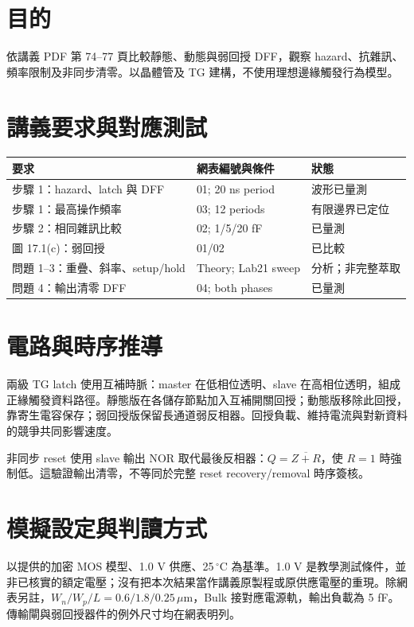\section{目的}

依講義 PDF 第 74--77 頁比較靜態、動態與弱回授 DFF，觀察 hazard、抗雜訊、頻率限制及非同步清零。以晶體管及 TG 建構，不使用理想邊緣觸發行為模型。

\section{講義要求與對應測試}

\begin{center}
\small
\setlength{\tabcolsep}{4pt}
\begin{tabular}{p{.42\linewidth}p{.29\linewidth}p{.18\linewidth}}
\toprule
要求 & 網表編號與條件 & 狀態 \\
\midrule
步驟 1：hazard、latch 與 DFF & 01; 20 ns period & 波形已量測 \\
步驟 1：最高操作頻率 & 03; 12 periods & 有限邊界已定位 \\
步驟 2：相同雜訊比較 & 02; 1/5/20 fF & 已量測 \\
圖 17.1(c)：弱回授 & 01/02 & 已比較 \\
問題 1--3：重疊、斜率、setup/hold & Theory; Lab21 sweep & 分析；非完整萃取 \\
問題 4：輸出清零 DFF & 04; both phases & 已量測 \\
\bottomrule
\end{tabular}
\end{center}

\section{電路與時序推導}

兩級 TG latch 使用互補時脈：master 在低相位透明、slave 在高相位透明，組成正緣觸發資料路徑。靜態版在各儲存節點加入互補開關回授；動態版移除此回授，靠寄生電容保存；弱回授版保留長通道弱反相器。回授負載、維持電流與對新資料的競爭共同影響速度。

非同步 reset 使用 slave 輸出 NOR 取代最後反相器：$Q=\overline{Z+R}$，使 $R=1$ 時強制低。這驗證輸出清零，不等同於完整 reset recovery/removal 時序簽核。

\section{模擬設定與判讀方式}

以提供的加密 MOS 模型、1.0 V 供應、25\,$^\circ$C 為基準。1.0 V 是教學測試條件，並非已核實的額定電壓；沒有把本次結果當作講義原製程或原供應電壓的重現。除網表另註，$W_n/W_p/L=0.6/1.8/0.25\,\mu\mathrm m$，Bulk 接對應電源軌，輸出負載為 5 fF。傳輸閘與弱回授器件的例外尺寸均在網表明列。

